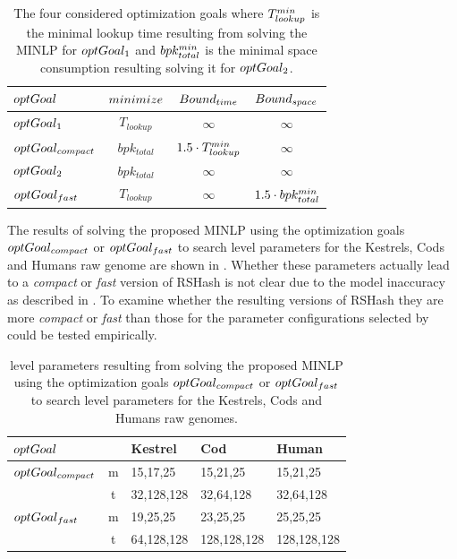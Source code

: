\documentclass[a4paper,titlepage,onecolumn,oneside,12pt,nenglish,titlepage=firstiscover]{scrbook}
\theoremstyle{plain} %
\theoremstyle{definition} %
\theoremstyle{remark} %
\theoremstyle{plain}
\newcommand{\timeForOperationOnStructure}[2]{T_{#1_{#2}}} %
\begin{document}
\begin{table}[h]
	\centering
	\begin{tabular}{l|ccc}
		\toprule
		$optGoal_{}$ & $minimize$ 	& $Bound_{time}$  & $Bound_{space}$ \\
		\midrule
		$optGoal_{1}$ & $\timeForOperationOnStructure{lookup}{}$& $\infty$ & $\infty$ \\
		$optGoal_{compact}$ & $bpk_{total}$ & $1.5 \cdot \minLookupTime$ & $\infty$ \\
		$optGoal_{2}$ & $bpk_{total}$ 							& $\infty$ & $\infty$ \\
		$optGoal_{fast}$ & $\timeForOperationOnStructure{lookup}{}$& $\infty$ & $1.5 \cdot bpk_{total}^{min}$ \\
		\bottomrule
	\end{tabular}
	\caption{The four considered optimization goals where $\minLookupTime$ is the minimal lookup time resulting from solving the MINLP for $optGoal_{1}$ and $bpk_{total}^{min}$ is the minimal space consumption resulting solving it for $optGoal_{2}$.} \label{tab:optGoals}
\end{table}

The results of solving the proposed MINLP using the optimization goals $optGoal_{compact}$ or $optGoal_{fast}$ to search level parameters for the Kestrels, Cods and Humans raw genome are shown in . Whether these parameters actually lead to a \textit{compact} or \textit{fast} version of RSHash is not clear due to the model inaccuracy as described in . To examine whether the resulting versions of RSHash they are more \textit{compact} or \textit{fast} than those for the parameter configurations selected by \cite{schulte-mattler_rshash_2026} could be tested empirically.

\begin{table}[h]
	\centering
	\begin{tabular}{lc|lll}
		\toprule
		$optGoal_{}$ & & Kestrel & Cod & Human \\
		\midrule
		$optGoal_{compact}$ & m & 15,17,25 & 15,21,25 & 15,21,25 \\
		& t & 32,128,128 & 32,64,128 & 32,64,128 \\
		\midrule
		$optGoal_{fast}$ & m & 19,25,25 & 23,25,25 & 25,25,25 \\
		& t & 64,128,128 & 128,128,128 & 128,128,128 \\
		\bottomrule
	\end{tabular}
	\caption{level parameters resulting from solving the proposed MINLP using the optimization goals $optGoal_{compact}$ or $optGoal_{fast}$ to search level parameters for the Kestrels, Cods and Humans raw genomes.}
	\label{tab:MINLPOptimalParameters}
\end{table}
\end{document}
